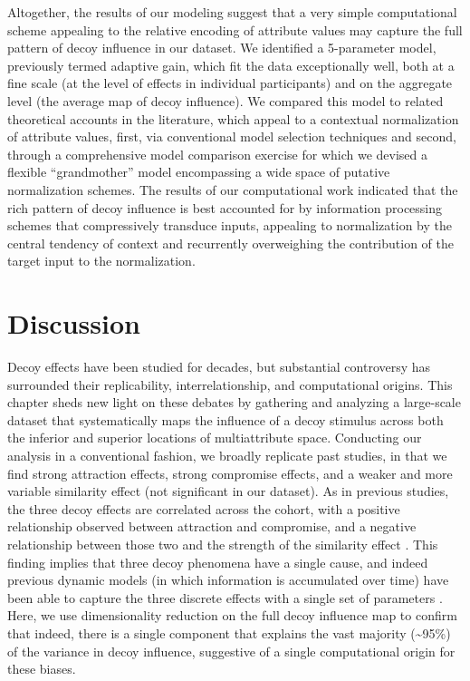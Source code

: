 \documentclass[a4paper, nobind]{templates/ociamthesis}
\begin{document}
Altogether, the results of our modeling suggest that a very simple computational scheme appealing to the relative encoding of attribute values may capture the full pattern of decoy influence in our dataset. We identified a 5-parameter model, previously termed adaptive gain, which fit the data exceptionally well, both at a fine scale (at the level of effects in individual participants) and on the aggregate level (the average map of decoy influence). We compared this model to related theoretical accounts in the literature, which appeal to a contextual normalization of attribute values, first, via conventional model selection techniques and second, through a comprehensive model comparison exercise for which we devised a flexible ``grandmother'' model encompassing a wide space of putative normalization schemes. The results of our computational work indicated that the rich pattern of decoy influence is best accounted for by information processing schemes that compressively transduce inputs, appealing to normalization by the central tendency of context and recurrently overweighing the contribution of the target input to the normalization.

\hypertarget{discussion}{%
\section{Discussion}\label{discussion}}

Decoy effects have been studied for decades, but substantial controversy has surrounded their replicability, interrelationship, and computational origins. This chapter sheds new light on these debates by gathering and analyzing a large-scale dataset that systematically maps the influence of a decoy stimulus across both the inferior and superior locations of multiattribute space. Conducting our analysis in a conventional fashion, we broadly replicate past studies, in that we find strong attraction effects, strong compromise effects, and a weaker and more variable similarity effect (not significant in our dataset). As in previous studies, the three decoy effects are correlated across the cohort, with a positive relationship observed between attraction and compromise, and a negative relationship between those two and the strength of the similarity effect \autocite{berkowitsch2014}. This finding implies that three decoy phenomena have a single cause, and indeed previous dynamic models (in which information is accumulated over time) have been able to capture the three discrete effects with a single set of parameters \autocite{roe2001,usher2004,bhatia2013,trueblood2014,bhui2018}. Here, we use dimensionality reduction on the full decoy influence map to confirm that indeed, there is a single component that explains the vast majority (\textasciitilde95\%) of the variance in decoy influence, suggestive of a single computational origin for these biases.
\end{document}
